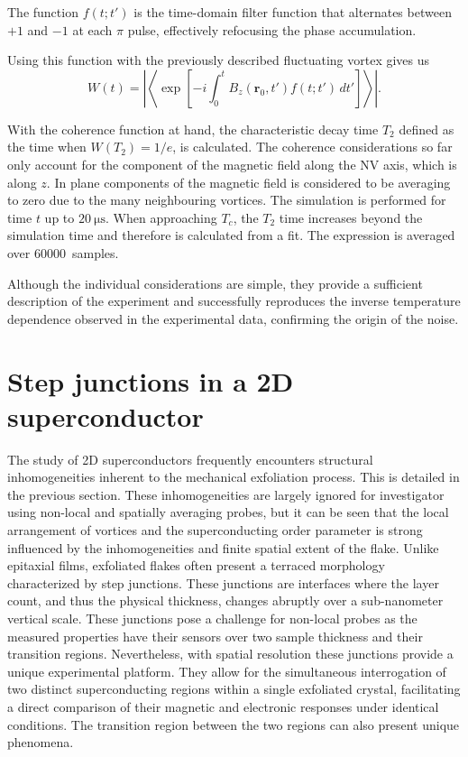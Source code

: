The function $f(t; t')$ is the time-domain filter function that alternates between $+1$ and $-1$ at each $\pi$ pulse, effectively refocusing the phase accumulation. 

Using this function with the previously described fluctuating vortex gives us 
\begin{equation}
    W(t) = \left\lvert\left\langle \exp\left[-i \int_{0}^{t} B_z(\mathbf{r}_0,t') f(t; t') \, dt' \right] \right\rangle\right\rvert.
\end{equation}

With the coherence function at hand, the characteristic decay time $T_2$ defined as the time when $W(T_2) = 1/e$, is calculated. The coherence considerations so far only account for the component of the magnetic field along the \gls{NV} axis, which is along $z$. In plane components of the magnetic field is considered to be averaging to zero due to the many neighbouring vortices. The simulation is performed for time $t$ up to $\qty{20}{\micro\second}$. When approaching $T_c$, the $T_2$ time increases beyond the simulation time and therefore is calculated from a fit. The expression is averaged over \qty{60000}{samples}.

Although the individual considerations are simple, they provide a sufficient description of the experiment and successfully reproduces the inverse temperature dependence observed in the experimental data, confirming the origin of the noise.

\section{Step junctions in a 2D superconductor}\label{sec:step}

The study of 2D superconductors frequently encounters structural inhomogeneities inherent to the mechanical exfoliation process. This is detailed in the previous section. These inhomogeneities are largely ignored for investigator using non-local and spatially averaging probes, but it can be seen that the local arrangement of vortices and the superconducting order parameter is strong influenced by the inhomogeneities and finite spatial extent of the flake\cite{jayaramProbingVortexDynamics2025}.  Unlike epitaxial films, exfoliated flakes often present a terraced morphology characterized by step junctions. These junctions are interfaces where the layer count, and thus the physical thickness, changes abruptly over a sub-nanometer vertical scale\cite{fridmanAnomalousThicknessDependence2025}. These junctions pose a challenge for non-local probes as the measured properties have their sensors over two sample thickness and their transition regions. Nevertheless, with spatial resolution these junctions provide a unique experimental platform. They allow for the simultaneous interrogation of two distinct superconducting regions within a single exfoliated crystal, facilitating a direct comparison of their magnetic and electronic responses under identical conditions. The transition region between the two regions can also present unique phenomena. 

